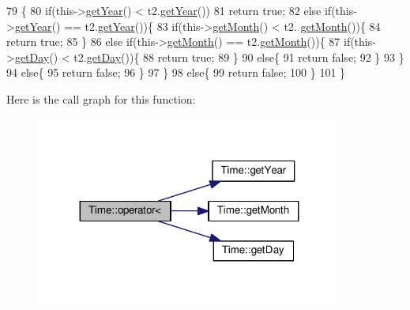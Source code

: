 \begin{DoxyCode}
79                              \{
80     \textcolor{keywordflow}{if}(this->\hyperlink{classTime_ade4d01d38041bb86a2e1ded9fd3cd28e}{getYear}() < t2.\hyperlink{classTime_ade4d01d38041bb86a2e1ded9fd3cd28e}{getYear}())
81         \textcolor{keywordflow}{return} \textcolor{keyword}{true};
82     \textcolor{keywordflow}{else} \textcolor{keywordflow}{if}(this->\hyperlink{classTime_ade4d01d38041bb86a2e1ded9fd3cd28e}{getYear}() == t2.\hyperlink{classTime_ade4d01d38041bb86a2e1ded9fd3cd28e}{getYear}())\{
83         \textcolor{keywordflow}{if}(this->\hyperlink{classTime_a22fd86b14d3b067cf1447fd9ca5caf6f}{getMonth}() < t2. \hyperlink{classTime_a22fd86b14d3b067cf1447fd9ca5caf6f}{getMonth}())\{
84             \textcolor{keywordflow}{return} \textcolor{keyword}{true};
85         \}
86         \textcolor{keywordflow}{else} \textcolor{keywordflow}{if}(this->\hyperlink{classTime_a22fd86b14d3b067cf1447fd9ca5caf6f}{getMonth}() == t2.\hyperlink{classTime_a22fd86b14d3b067cf1447fd9ca5caf6f}{getMonth}())\{
87             \textcolor{keywordflow}{if}(this->\hyperlink{classTime_abdccc37217b520155a67a1d732014f1a}{getDay}() < t2.\hyperlink{classTime_abdccc37217b520155a67a1d732014f1a}{getDay}())\{
88                 \textcolor{keywordflow}{return} \textcolor{keyword}{true};
89             \}
90             \textcolor{keywordflow}{else}\{
91                 \textcolor{keywordflow}{return} \textcolor{keyword}{false};
92             \}
93         \}
94         \textcolor{keywordflow}{else}\{
95             \textcolor{keywordflow}{return} \textcolor{keyword}{false};
96         \}
97     \}
98     \textcolor{keywordflow}{else}\{
99     \textcolor{keywordflow}{return} \textcolor{keyword}{false};
100     \}
101 \}
\end{DoxyCode}


Here is the call graph for this function\+:
\nopagebreak
\begin{figure}[H]
\begin{center}
\leavevmode
\includegraphics[width=287pt]{classTime_a36e9d3c27e0f42d2d83f9831dcc4a670_cgraph}
\end{center}
\end{figure}


